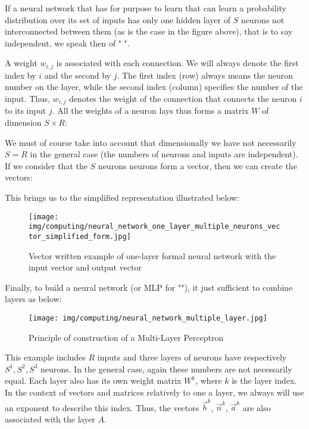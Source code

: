	\begin{tcolorbox}[title=Remark,colframe=black,arc=10pt]
	If a neural network that has for purpose to learn that can learn a probability distribution over its set of inputs has only one hidden layer of $S$ neurons not interconnected between them (as is the case in the figure above), that is to say independent, we speak then of " ".
	\end{tcolorbox}
	
	A weight $w_{i,j}$ is associated with each connection. We will always denote the first index by $i$ and the second by $j$. The first index (row) always means the neuron number on the layer, while the second index (column) specifies the number of the input. Thus, $w_{i,j}$ denotes the weight of the connection that connects the neuron $i$ to its input $j$. All the weights of a neuron lays thus forms a matrix $W$ of dimension $S\times R$:
	
	We must of course take into account that dimensionally we have not necessarily $S=R$ in the general case (the numbers of neurons and inputs are independent). If we consider that the $S$ neurons neurons form a vector, then we can create the vectors:
	
	This brings us to the simplified representation illustrated below:
	\begin{figure}[H]
		\centering
		\texttt{[image: img/computing/neural\_network\_one\_layer\_multiple\_neurons\_vector\_simplified\_form.jpg]}
		\caption{Vector written example of one-layer formal neural network with the input vector and output vector}
	\end{figure}
	Finally, to build a neural network (or MLP for ""), it just sufficient to combine layers as below:
	\begin{figure}[H]
		\centering
		\texttt{[image: img/computing/neural\_network\_multiple\_layer.jpg]}
		\caption{Principle of construction of a Multi-Layer Perceptron}
	\end{figure}
	This example includes $R$ inputs and three layers of neurons have respectively $S^1,S^2,S^3$ neurons. In the general case, again these numbers are not necessarily equal. Each layer also has its own weight matrix $W^k$, where $k$ is the layer index. In the context of vectors and matrices relatively to one a layer, we always will use an exponent to describe this index. Thus, the vectors $\vec{b}^k$, $\vec{n}^k$, $\vec{a}^k$ are also associated with the layer $A$.
	
